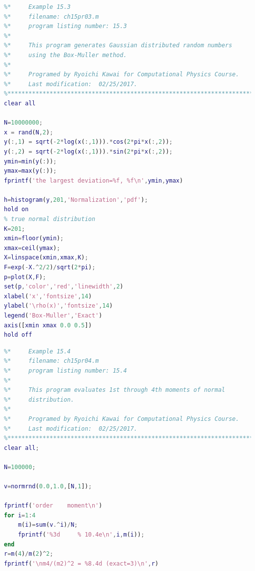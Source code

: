 \bigskip
\noindent
\program
\label{prog:box-muller}
\footnotesize
\begin{lstlisting}[language=matlab]
%**************************************************************************
%*     Example 15.3                                                       *
%*     filename: ch15pr03.m                                               *
%*     program listing number: 15.3                                       *
%*                                                                        *
%*     This program generates Gaussian distributed random numbers         *
%*     using the Box-Muller method.                                       *
%*                                                                        *
%*     Programed by Ryoichi Kawai for Computational Physics Course.       *
%*     Last modification:  02/25/2017.                                    *
%**************************************************************************
clear all

N=10000000;
x = rand(N,2);
y(:,1) = sqrt(-2*log(x(:,1))).*cos(2*pi*x(:,2));
y(:,2) = sqrt(-2*log(x(:,1))).*sin(2*pi*x(:,2));
ymin=min(y(:));
ymax=max(y(:));
fprintf('the largest deviation=%f, %f\n',ymin,ymax)

h=histogram(y,201,'Normalization','pdf');
hold on
% true normal distribution
K=201;
xmin=floor(ymin);
xmax=ceil(ymax);
X=linspace(xmin,xmax,K);
F=exp(-X.^2/2)/sqrt(2*pi);
p=plot(X,F);
set(p,'color','red','linewidth',2)
xlabel('x','fontsize',14)
ylabel('\rho(x)','fontsize',14)
legend('Box-Muller','Exact')
axis([xmin xmax 0.0 0.5])
hold off
\end{lstlisting}
\normalsize


\bigskip
\noindent
\program
\label{prog:normal_dist}
\footnotesize
\begin{lstlisting}[language=matlab]
%**************************************************************************
%*     Example 15.4                                                       *
%*     filename: ch15pr04.m                                               *
%*     program listing number: 15.4                                       *
%*                                                                        *
%*     This program evaluates 1st through 4th moments of normal           *
%*     distribution.                                                      *
%*                                                                        *
%*     Programed by Ryoichi Kawai for Computational Physics Course.       *
%*     Last modification:  02/25/2017.                                    *
%**************************************************************************
clear all;

N=100000;

v=normrnd(0.0,1.0,[N,1]);

fprintf('order    moment\n')
for i=1:4
    m(i)=sum(v.^i)/N;
    fprintf('%3d     % 10.4e\n',i,m(i));
end
r=m(4)/m(2)^2;
fprintf('\nm4/(m2)^2 = %8.4d (exact=3)\n',r)
\end{lstlisting}
\normalsize


